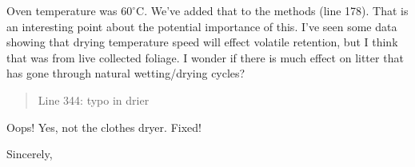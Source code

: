 \documentclass[letterpaper, 12pt]{letter}
\begin{document}
\begin{letter}{}
Oven temperature was $60^\circ$C. We've added that to the methods (line 178).
That is an interesting point about the potential importance of this. I've seen
some data showing that drying temperature speed will effect volatile retention,
but I think that was from live collected foliage. I wonder if there is much
effect on litter that has gone through natural wetting/drying cycles?

\begin{quote}
Line 344: typo in drier
\end{quote}

Oops! Yes, not the clothes dryer. Fixed!


\closing{Sincerely,}

\end{letter}
\end{document}
